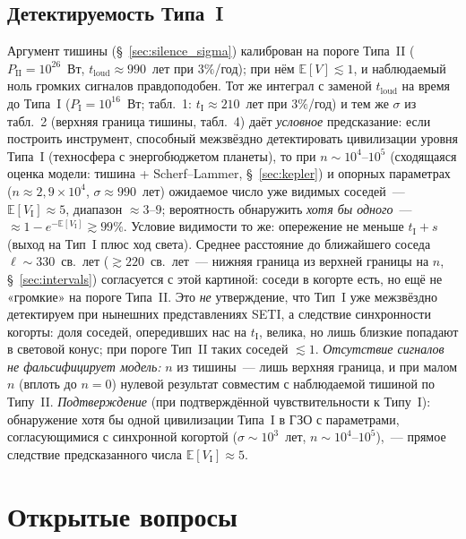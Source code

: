 \documentclass[12pt,a4paper]{article}
\begin{document}
\subsection{Детектируемость Типа~I}\label{sec:pred_type1}

Аргумент тишины (\S~\ref{sec:silence_sigma}) калиброван на пороге Типа~II ($P_{\mathrm{II}} = 10^{26}$~Вт, $t_{\mathrm{loud}} \approx 990$~лет при $3\%$/год); при нём $\mathbb{E}[V] \lesssim 1$, и наблюдаемый ноль громких сигналов правдоподобен. Тот же интеграл с заменой $t_{\mathrm{loud}}$ на время до Типа~I ($P_{\mathrm{I}} = 10^{16}$~Вт; табл.~1: $t_{\mathrm{I}} \approx 210$~лет при $3\%$/год) и тем же $\sigma$ из табл.~2 (верхняя граница тишины, табл.~4) даёт \emph{условное} предсказание: если построить инструмент, способный межзвёздно детектировать цивилизации уровня Типа~I (техносфера с энергобюджетом планеты), то при $n \sim 10^4$--$10^5$ (сходящаяся оценка модели: тишина + Scherf--Lammer, \S~\ref{sec:kepler}) и опорных параметрах ($n \approx 2{,}9\times10^4$, $\sigma \approx 990$~лет) ожидаемое число уже видимых соседей~--- $\mathbb{E}[V_{\mathrm{I}}] \approx 5$, диапазон $\approx 3$--$9$; вероятность обнаружить \emph{хотя бы одного}~--- $\approx 1 - e^{-\mathbb{E}[V_{\mathrm{I}}]} \gtrsim 99\%$. Условие видимости то же: опережение не меньше $t_{\mathrm{I}} + s$ (выход на Тип~I плюс ход света). Среднее расстояние до ближайшего соседа $\ell \sim 330$~св.~лет ($\gtrsim 220$~св.~лет~--- нижняя граница из верхней границы на $n$, \S~\ref{sec:intervals}) согласуется с этой картиной: соседи в когорте есть, но ещё не «громкие» на пороге Типа~II. Это \emph{не} утверждение, что Тип~I уже межзвёздно детектируем при нынешних представлениях SETI, а следствие синхронности когорты: доля соседей, опередивших нас на $t_{\mathrm{I}}$, велика, но лишь близкие попадают в световой конус; при пороге Тип~II таких соседей $\lesssim 1$. \emph{Отсутствие сигналов не фальсифицирует модель:} $n$ из тишины~--- лишь верхняя граница, и при малом $n$ (вплоть до $n=0$) нулевой результат совместим с наблюдаемой тишиной по Типу~II. \emph{Подтверждение} (при подтверждённой чувствительности к Типу~I): обнаружение хотя бы одной цивилизации Типа~I в ГЗО с параметрами, согласующимися с синхронной когортой ($\sigma \sim 10^3$~лет, $n \sim 10^4$--$10^5$),~--- прямое следствие предсказанного числа $\mathbb{E}[V_{\mathrm{I}}] \approx 5$.

\section{Открытые вопросы}
\label{sec:open}
\end{document}
